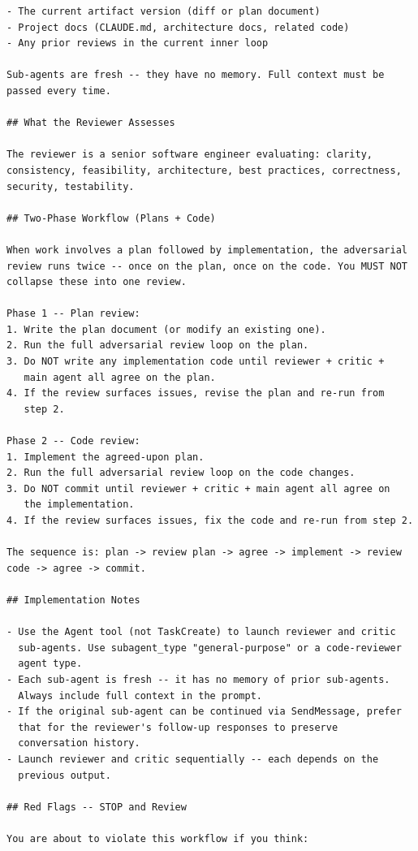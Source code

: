 \documentclass{article}
\begin{document}
\begin{footnotesize}
\begin{verbatim}
- The current artifact version (diff or plan document)
- Project docs (CLAUDE.md, architecture docs, related code)
- Any prior reviews in the current inner loop

Sub-agents are fresh -- they have no memory. Full context must be
passed every time.

## What the Reviewer Assesses

The reviewer is a senior software engineer evaluating: clarity,
consistency, feasibility, architecture, best practices, correctness,
security, testability.

## Two-Phase Workflow (Plans + Code)

When work involves a plan followed by implementation, the adversarial
review runs twice -- once on the plan, once on the code. You MUST NOT
collapse these into one review.

Phase 1 -- Plan review:
1. Write the plan document (or modify an existing one).
2. Run the full adversarial review loop on the plan.
3. Do NOT write any implementation code until reviewer + critic +
   main agent all agree on the plan.
4. If the review surfaces issues, revise the plan and re-run from
   step 2.

Phase 2 -- Code review:
1. Implement the agreed-upon plan.
2. Run the full adversarial review loop on the code changes.
3. Do NOT commit until reviewer + critic + main agent all agree on
   the implementation.
4. If the review surfaces issues, fix the code and re-run from step 2.

The sequence is: plan -> review plan -> agree -> implement -> review
code -> agree -> commit.

## Implementation Notes

- Use the Agent tool (not TaskCreate) to launch reviewer and critic
  sub-agents. Use subagent_type "general-purpose" or a code-reviewer
  agent type.
- Each sub-agent is fresh -- it has no memory of prior sub-agents.
  Always include full context in the prompt.
- If the original sub-agent can be continued via SendMessage, prefer
  that for the reviewer's follow-up responses to preserve
  conversation history.
- Launch reviewer and critic sequentially -- each depends on the
  previous output.

## Red Flags -- STOP and Review

You are about to violate this workflow if you think:


\end{verbatim}
\end{footnotesize}
\end{document}
